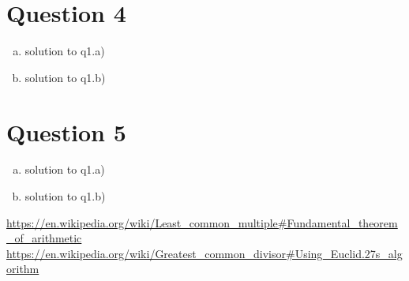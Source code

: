 \documentclass[11pt, a4paper]{article}
\begin{document}
\section*{Question 4}
\begin{enumerate}[(a)]
	\item solution to q1.a)
	\item solution to q1.b)
\end{enumerate}

\section*{Question 5}
\begin{enumerate}[(a)]
	\item solution to q1.a)
	\item solution to q1.b)
\end{enumerate}

\begin{thebibliography}{99}
\url{https://en.wikipedia.org/wiki/Least_common_multiple#Fundamental_theorem_of_arithmetic} 
\url{https://en.wikipedia.org/wiki/Greatest_common_divisor#Using_Euclid.27s_algorithm}
\end{thebibliography}
\end{document}
